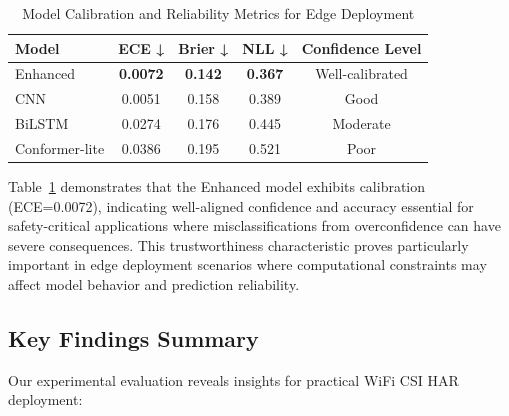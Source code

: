 \documentclass[journal]{IEEEtran}
\begin{document}
\begin{table}[ht]
\centering
\caption{Model Calibration and Reliability Metrics for Edge Deployment}
\begin{tabular}{@{}lcccc@{}}
\toprule
\textbf{Model} & \textbf{ECE ↓} & \textbf{Brier ↓} & \textbf{NLL ↓} & \textbf{Confidence Level} \\
\midrule
Enhanced & \textbf{0.0072} & \textbf{0.142} & \textbf{0.367} & Well-calibrated \\
CNN & 0.0051 & 0.158 & 0.389 & Good \\
BiLSTM & 0.0274 & 0.176 & 0.445 & Moderate \\
Conformer-lite & 0.0386 & 0.195 & 0.521 & Poor \\
\bottomrule
\end{tabular}
\label{tab:calibration}
\end{table}

Table~\ref{tab:calibration} demonstrates that the Enhanced model exhibits calibration (ECE=0.0072), indicating well-aligned confidence and accuracy essential for safety-critical applications where misclassifications from overconfidence can have severe consequences. This trustworthiness characteristic proves particularly important in edge deployment scenarios where computational constraints may affect model behavior and prediction reliability.

\subsection{Key Findings Summary}

Our experimental evaluation reveals insights for practical WiFi CSI HAR deployment:
\end{document}
